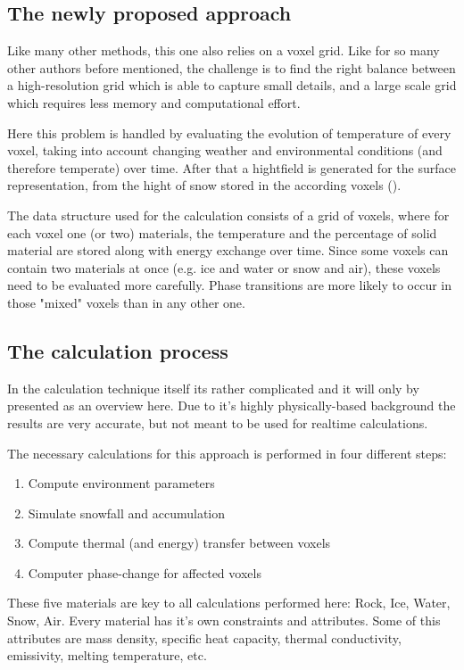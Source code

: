 \subsection{The newly proposed approach}
Like many other methods, this one also relies on a voxel grid. Like for so many other authors before mentioned, the challenge is to find the right balance between a high-resolution grid which is able to capture small details, and a large scale grid which requires less memory and computational effort.

Here this problem is handled by evaluating the evolution of temperature of every voxel, taking into account changing weather and environmental conditions (and therefore temperate) over time. After that a hightfield is generated for the surface representation, from the hight of snow stored in the according voxels ().

The data structure used for the calculation consists of a grid of voxels, where for each voxel one (or two) materials, the temperature and the percentage of solid material are stored along with energy exchange over time. Since some voxels can contain two materials at once (e.g. ice and water or snow and air), these voxels need to be evaluated more carefully. Phase transitions are more likely to occur in those "mixed" voxels than in any other one.

\subsection{The calculation process}
In the calculation technique itself its rather complicated and it will only by presented as an overview here. Due to it's highly physically-based background the results are very accurate, but not meant to be used for realtime calculations.

The necessary calculations for this approach is performed in four different steps:
\begin{enumerate}
	\item Compute environment parameters
	\item Simulate snowfall and accumulation
	\item Compute thermal (and energy) transfer between voxels
	\item Computer phase-change for affected voxels
\end{enumerate}

These five materials are key to all calculations performed here: Rock, Ice, Water, Snow, Air. Every material has it's own constraints and attributes. Some of this attributes are mass density, specific heat capacity, thermal conductivity, emissivity, melting temperature, etc.

